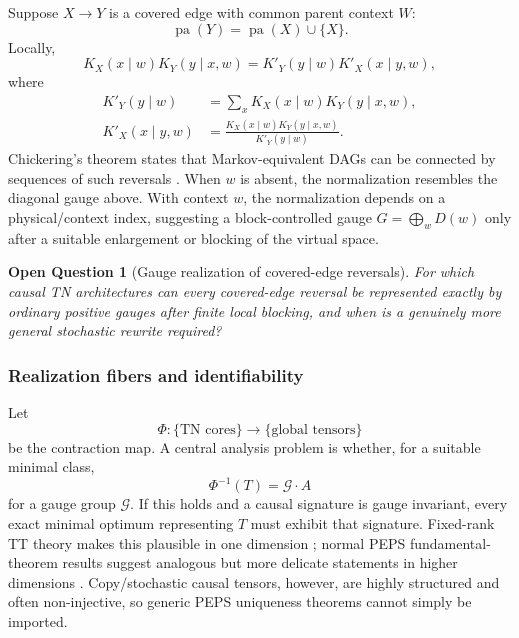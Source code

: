 \documentclass[11pt]{article}
\newtheorem{question}[definition]{Open Question}
\theoremstyle{remark}
\newcommand{\pa}{\operatorname{pa}}
\newcommand{\cG}{\mathcal G}
\begin{document}
Suppose $X\to Y$ is a covered edge with common parent context $W$:
\begin{equation}
\pa(Y)=\pa(X)\cup\{X\}.
\end{equation}
Locally,
\begin{equation}
K_X(x\mid w)K_Y(y\mid x,w)
=K'_Y(y\mid w)K'_X(x\mid y,w),
\end{equation}
where
\begin{align}
K'_Y(y\mid w)&=\sum_x K_X(x\mid w)K_Y(y\mid x,w),\\
K'_X(x\mid y,w)&=\frac{K_X(x\mid w)K_Y(y\mid x,w)}{K'_Y(y\mid w)}.
\end{align}
Chickering's theorem states that Markov-equivalent DAGs can be connected by sequences of such reversals \cite{chickering1995transformational}. When $w$ is absent, the normalization resembles the diagonal gauge above. With context $w$, the normalization depends on a physical/context index, suggesting a block-controlled gauge $G=\bigoplus_w D(w)$ only after a suitable enlargement or blocking of the virtual space.

\begin{question}[Gauge realization of covered-edge reversals]
For which causal TN architectures can every covered-edge reversal be represented exactly by ordinary positive gauges after finite local blocking, and when is a genuinely more general stochastic rewrite required?
\end{question}

\subsubsection{Realization fibers and identifiability}

Let
\begin{equation}
\Phi:\{\text{TN cores}\}\to\{\text{global tensors}\}
\end{equation}
be the contraction map. A central analysis problem is whether, for a suitable minimal class,
\begin{equation}
\Phi^{-1}(T)=\cG\cdot A
\label{eq:fiber-gauge-orbit}
\end{equation}
for a gauge group $\cG$. If this holds and a causal signature is gauge invariant, every exact minimal optimum representing $T$ must exhibit that signature. Fixed-rank TT theory makes this plausible in one dimension \cite{holtz2012manifolds}; normal PEPS fundamental-theorem results suggest analogous but more delicate statements in higher dimensions \cite{molnar2018normal}. Copy/stochastic causal tensors, however, are highly structured and often non-injective, so generic PEPS uniqueness theorems cannot simply be imported.
\end{document}

